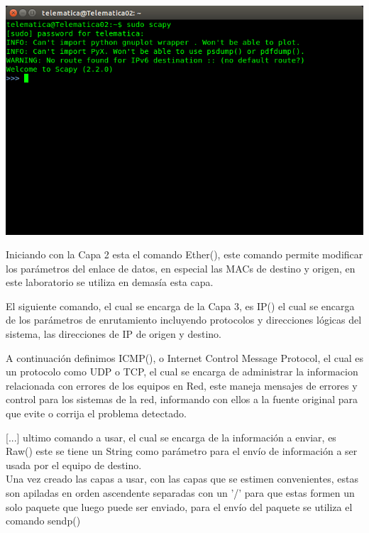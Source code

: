 \documentclass[spanish]{udpreport}
\begin{document}
\begin{center}
	\includegraphics[scale=.37]{imagenes/Scapy_Init.png}
\end{center}

Iniciando con la Capa 2 esta el comando Ether(), este comando permite modificar los parámetros del enlace de datos, en especial las MACs de destino y origen, en este laboratorio se utiliza en demasía esta capa.


El siguiente comando, el cual se encarga de la Capa 3, es IP() el cual se encarga de los parámetros de enrutamiento incluyendo protocolos y direcciones lógicas del sistema, las direcciones de IP de origen y destino.


A continuación definimos ICMP(), o Internet Control Message Protocol, el cual es un protocolo como UDP o TCP, el cual se encarga de administrar la informacion relacionada con errores de los equipos en Red, este maneja mensajes de errores y control para los sistemas de la red, informando con ellos a la fuente original para que evite o corrija el problema detectado.

[...] ultimo comando a usar, el cual se encarga de la información a enviar, es Raw() este se tiene un String como parámetro para el envío de información a ser usada por el equipo de destino.
\\

Una vez creado las capas a usar, con las capas que se estimen convenientes, estas son apiladas en orden ascendente separadas con un '/' para que estas formen un solo paquete que luego puede ser enviado, para el envío del paquete se utiliza el comando sendp() %
\end{document}
